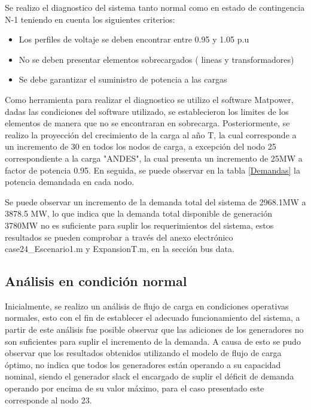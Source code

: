 \documentclass{article}
\begin{document}
Se realizo el diagnostico del sistema tanto normal como en estado de contingencia N-1 teniendo en cuenta los siguientes criterios: 
\begin{itemize}
    \item Los perfiles de voltaje se deben encontrar entre 0.95 y 1.05 p.u
    \item No se deben presentar elementos sobrecargados ( lineas y transformadores)
    \item Se debe garantizar el suministro de potencia a las cargas
\end{itemize}

Como herramienta para realizar el diagnostico se utilizo el software Matpower, dadas las condiciones del software utilizado, se establecieron los limites de los elementos de manera que no se encontraran en sobrecarga. Posteriormente, se realizo la proyección del crecimiento de la carga al año T, la cual corresponde a un incremento de 30 en todos los nodos de carga, a excepción del nodo 25 correspondiente a la carga "ANDES", la cual presenta un incremento de 25MW a factor de potencia 0.95. En seguida, se puede observar en la tabla \ref{Demandas} la potencia demandada en cada nodo. 




Se puede observar un incremento de la demanda total del sistema de 2968.1MW a 3878.5 MW, lo que indica que la demanda total disponible de generación 3780MW no es suficiente para suplir los requerimientos del sistema, estos resultados se pueden comprobar a través del anexo electrónico case24\_Escenario1.m y ExpansionT.m, en la sección bus data.

\subsection{Análisis en condición normal}

Inicialmente, se realizo un análisis de flujo de carga en condiciones operativas normales, esto con el fin de establecer el adecuado funcionamiento del sistema, a partir de este análisis fue posible observar que las adiciones de los generadores no son suficientes para suplir el incremento de la demanda. A causa de esto se pudo observar que los resultados obtenidos utilizando el modelo de flujo de carga óptimo, no indica que todos los generadores están operando a su capacidad nominal, siendo el generador slack el encargado de suplir el déficit de demanda operando por encima de su valor máximo, para el caso presentado este corresponde al nodo 23. \\
\end{document}
